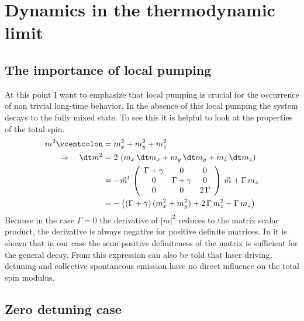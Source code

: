 \chapter{Dynamics in the thermodynamic limit}\label{ch:mean_field_analysis}
\section{The importance of local pumping}
At this point I want to emphasize that local pumping is crucial for the occurrence of non trivial long-time behavior. In the absence of this local pumping the system decays to the fully mixed state. To see this it is helpful to look at the properties of the total spin.
\begin{align}
    m^2\vcentcolon&=m_x^2+m_y^2+m_z^2\notag\\
    \Rightarrow\quad\dt m^2&=2\,\left( m_x\,\dt m_x +m_y\,\dt m_y +m_z\,\dt m_z \right)\notag\\
    &=-\vec{m}^t\,\left( \begin{array}{ccc}
        \Gamma+\gamma & 0&0  \\
        0& \Gamma+\gamma & 0\\
        0&0&2\,\Gamma
   \end{array}\right)\,\vec{m}+\Gamma\,m_z\notag\\
   &=-\left(  (\Gamma+\gamma)\,(m_x^2+m_y^2)+2\,\Gamma\,m_z^2-\Gamma\,m_z \right)
\end{align}
Because in the case $\Gamma=0$ the derivative of $|m|^2$ reduces to the matrix scalar product, the derivative is always negative for positive definite matrices.  In  it is shown that in our case the semi-positive definiteness of the matrix is sufficient for the general decay. From this expression can also be told that laser driving, detuning and collective spontaneous emission have no direct influence on the total spin modulus.

\section{Zero detuning case}\label{sec:zero_detuning}
